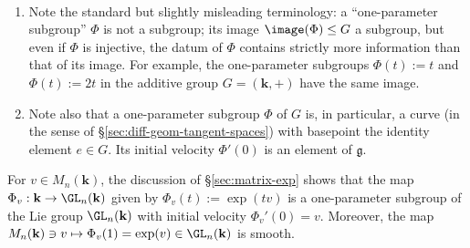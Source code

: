 \documentclass[reqno]{amsart} 
\begin{document}
\begin{remark}
~
  \begin{enumerate}
  \item Note the standard but slightly misleading terminology: a
    ``one-parameter subgroup'' $\Phi$ is not a subgroup;
    its image $\image(\Phi) \leq G$ a subgroup,
    but even if $\Phi$ is injective, the datum of $\Phi$ contains
    strictly more information than that of its image.
    For example, 
    the one-parameter subgroups $\Phi(t) := t$
    and $\Phi(t) := 2 t$ in the additive group $G = (\mathbf{k},+)$ have the same image.
  \item Note also that a one-parameter subgroup $\Phi$ of $G$ is, in
    particular, a curve (in the sense of
    \S\ref{sec:diff-geom-tangent-spaces}) with basepoint the
    identity element $e \in G$.  Its initial velocity $\Phi '(0)$
    is an element of $\mathfrak{g}$.
  \end{enumerate}
\end{remark}

\begin{example}\label{example:one-param-subgroups-gln}
  For $v \in M_n(\mathbf{k})$, the discussion of
  \S\ref{sec:matrix-exp} shows that the map
  $\Phi_v : \mathbf{k} \rightarrow \GL_n(\mathbf{k})$ given by
  $\Phi_v(t) := \exp(t v)$ is a one-parameter subgroup of the
  Lie group $\GL_n(\mathbf{k})$
  with initial velocity $\Phi_v'(0) = v$.
  Moreover, the map $M_n(\mathbf{k}) \ni v \mapsto \Phi_v(1) = \exp(v) \in \GL_n(\mathbf{k})$ is smooth.
\end{example}
\end{document}
